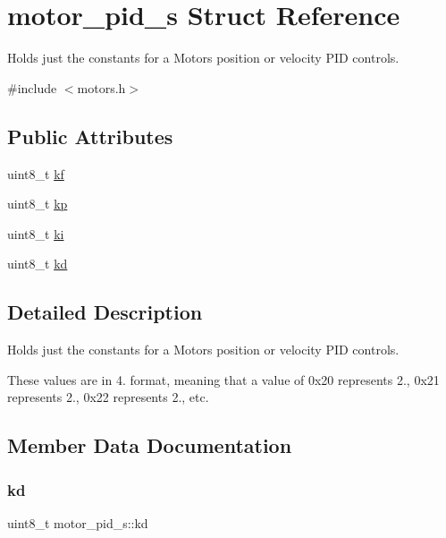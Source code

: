 \hypertarget{structmotor__pid__s}{}\section{motor\+\_\+pid\+\_\+s Struct Reference}
\label{structmotor__pid__s}


Holds just the constants for a Motor\textquotesingle{}s position or velocity P\+ID controls.  




{\ttfamily \#include $<$motors.\+h$>$}

\subsection*{Public Attributes}
\begin{DoxyCompactItemize}
\item 
uint8\+\_\+t \hyperlink{structmotor__pid__s_aad53ebe7d1c645811b3dc6cb825bd590}{kf}
\item 
uint8\+\_\+t \hyperlink{structmotor__pid__s_a31c38ff6a4245e81c4db42579b90be31}{kp}
\item 
uint8\+\_\+t \hyperlink{structmotor__pid__s_ac894dd6c3683c2daa403b81e259a1cae}{ki}
\item 
uint8\+\_\+t \hyperlink{structmotor__pid__s_a5241cf4e6e0b3aed6cf9fc52d83769ab}{kd}
\end{DoxyCompactItemize}


\subsection{Detailed Description}
Holds just the constants for a Motor\textquotesingle{}s position or velocity P\+ID controls. 

These values are in 4. format, meaning that a value of 0x20 represents 2., 0x21 represents 2., 0x22 represents 2., etc. 

\subsection{Member Data Documentation}
\mbox{\label{structmotor__pid__s_a5241cf4e6e0b3aed6cf9fc52d83769ab}} 
\subsubsection{\texorpdfstring{kd}{kd}}
{\footnotesize\ttfamily uint8\+\_\+t motor\+\_\+pid\+\_\+s\+::kd}

